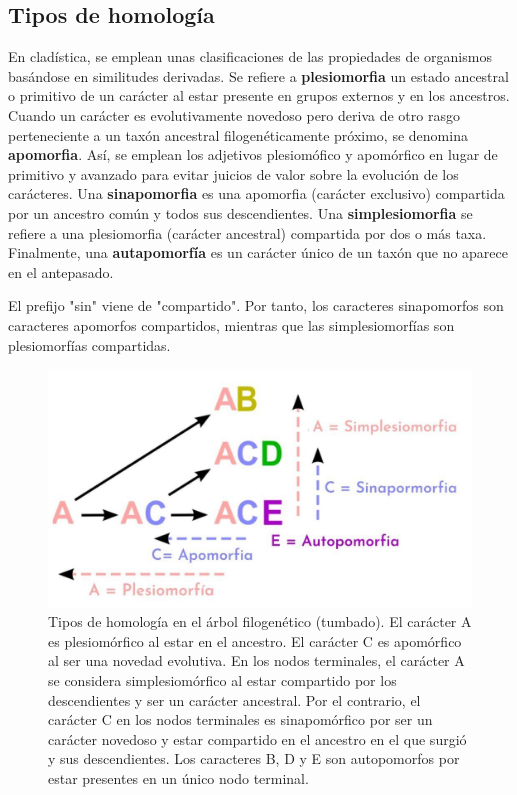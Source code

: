 \subsection{Tipos de homología}
En cladística, se emplean unas clasificaciones de las propiedades de organismos basándose en similitudes derivadas. Se refiere a \textbf{plesiomorfia} un estado ancestral o primitivo de un carácter al estar presente en grupos externos y en los ancestros. Cuando un carácter es evolutivamente novedoso pero deriva de otro rasgo perteneciente a un taxón ancestral filogenéticamente próximo, se denomina \textbf{apomorfia}. Así, se emplean los adjetivos plesiomófico y apomórfico en lugar de primitivo y avanzado para evitar juicios de valor sobre la evolución de los carácteres. Una \textbf{sinapomorfia} es una apomorfia (carácter exclusivo) compartida por un ancestro común y todos sus descendientes. Una \textbf{simplesiomorfia} se refiere a una plesiomorfia (carácter ancestral) compartida por dos o más taxa. Finalmente, una \textbf{autapomorfía} es un carácter único de un taxón que no aparece en el antepasado. 

\begin{table}[htbp]
\begin{mdframed}[backgroundcolor=black!10]
    \centering
    El prefijo "sin" viene de "compartido". Por tanto, los caracteres sinapomorfos son caracteres apomorfos compartidos, mientras que las simplesiomorfías son plesiomorfías compartidas.
    \end{mdframed}
\end{table}

\begin{figure}[htbp]
\centering
\includegraphics[width=0.5\linewidth]{figs/sinapomorfia.jpg}
\caption{Tipos de homología en el árbol filogenético (tumbado). El carácter A es plesiomórfico al estar en el ancestro. El carácter C es apomórfico al ser una novedad evolutiva. En los nodos terminales, el carácter A se considera simplesiomórfico al estar compartido por los descendientes y ser un carácter ancestral. Por el contrario, el carácter C en los nodos terminales es sinapomórfico por ser un carácter novedoso y estar compartido en el ancestro en el que surgió y sus descendientes. Los caracteres B, D y E son autopomorfos por estar presentes en un único nodo terminal.}
\end{figure}

